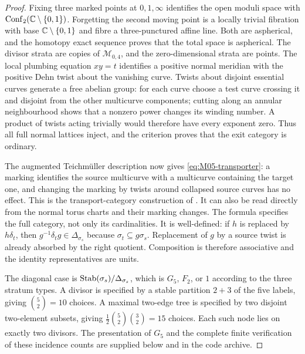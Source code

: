 \begin{proof}
Fixing three marked points at $0,1,\infty$ identifies the open moduli
space with $\operatorname{Conf}_2(\mathbb C\setminus\{0,1\})$.
Forgetting the second moving point is a locally trivial fibration with
base $\mathbb C\setminus\{0,1\}$ and fibre a three-punctured affine line.
Both are aspherical, and the homotopy exact sequence proves that the
total space is aspherical. The divisor strata are copies of
$\mathcal M_{0,4}$, and the zero-dimensional strata are points.
The local plumbing equation $xy=t$ identifies a positive normal
meridian with the positive Dehn twist about the vanishing curve.
Twists about disjoint essential curves generate a free abelian group:
for each curve choose a test curve crossing it and disjoint from the
other multicurve components; cutting along an annular neighbourhood
shows that a nonzero power changes its winding number. A product of
twists acting trivially would therefore have every exponent zero.
Thus all full normal lattices inject, and the criterion proves that
the exit category is ordinary.

The augmented Teichm\"uller description now gives
\eqref{eq:M05-transporter}: a marking identifies the source multicurve
with a multicurve containing the target one, and changing the marking
by twists around collapsed source curves has no effect. This is the
transport-category construction of \citet[Construction~3.18,
Corollary~6.6 and Theorem~6.7]{Jansen2023}. It can also be read directly
from the normal torus charts and their marking changes. The formula
specifies the full category, not only its cardinalities. It is
well-defined: if $h$ is replaced by $h\delta_t$, then
$g^{-1}\delta_tg\in\Delta_{\sigma_s}$ because
$\sigma_t\subseteq g\sigma_s$. Replacement of $g$ by a source twist is
already absorbed by the right quotient. Composition is therefore
associative and the identity representatives are units.

The diagonal case is
$\operatorname{Stab}(\sigma_s)/\Delta_{\sigma_s}$, which is $G_5$, $F_2$, or $1$
according to the three stratum types. A divisor is specified by a stable
partition $2+3$ of the five labels, giving $\binom52=10$ choices. A
maximal two-edge tree is specified by two disjoint two-element subsets,
giving $\frac12\binom52\binom32=15$ choices. Each such node lies on
exactly two divisors. The presentation of $G_5$ and the complete finite
verification of these incidence counts are supplied below and in the
code archive.
\end{proof}

